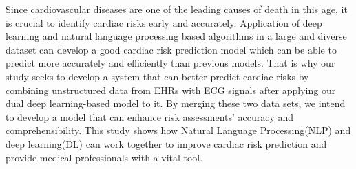 Since cardiovascular diseases are one of the leading causes of death in this age, it is crucial to identify cardiac risks early and accurately. Application of deep learning and natural language processing based algorithms in a large and diverse dataset can develop a good cardiac risk prediction model which can be able to predict more accurately and efficiently than previous models. That is why our study seeks to develop a system that can better predict cardiac risks by combining unstructured data from EHRs with ECG signals after applying our dual deep learning-based model to it. By merging these two data sets, we intend to develop a model that can enhance risk assessments' accuracy and comprehensibility. This study shows how Natural Language Processing(NLP)  and deep learning(DL) can work together to improve cardiac risk prediction and provide medical professionals with a vital tool.
